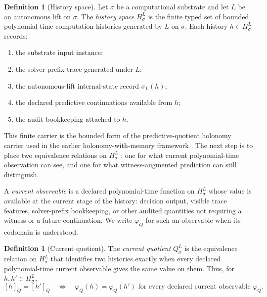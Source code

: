 \documentclass[11pt]{article}
\newcommand{\Substrate}{\sigma}             \newcommand{\Lift}{L}                       \newcommand{\LiftState}{\sigma_{L}}         \newcommand{\HistorySpace}{H_{\Substrate}^{\Lift}}
\newcommand{\Qquotient}{Q_{\Substrate}^{\Lift}}
\newcommand{\Qclass}[1]{[#1]_{Q}}
\newcommand{\CurrentObservable}{\varphi_{Q}}    \newcommand{\Exposure}{\operatorname{Exposure}}
\theoremstyle{definition}
\newtheorem{definition}[theorem]{Definition}
\begin{document}
\begin{definition}[History space]
\label{def:history-space}
Let \(\Substrate\) be a computational substrate and let \(\Lift\) be
an autonomous lift on \(\Substrate\).  The \emph{history space}
\(\HistorySpace\) is the finite typed set of bounded polynomial-time
computation histories generated by \(\Lift\) on \(\Substrate\).  Each
history \(h\in\HistorySpace\) records:
\begin{enumerate}
  \item the substrate input instance;
  \item the solver-prefix trace generated under \(\Lift\);
  \item the autonomous-lift internal-state record \(\LiftState(h)\);
  \item the declared predictive continuations available from \(h\);
  \item the audit bookkeeping attached to \(h\).
\end{enumerate}
\end{definition}

This finite carrier is the bounded form of the predictive-quotient
holonomy carrier used in the earlier holonomy-with-memory framework
\citep{TsiokosHolonomyMemory2026}.  The next step is to place two
equivalence relations on \(\HistorySpace\)
\citep{Halmos1960NaiveSetTheory}: one for what current polynomial-time
observation can see, and one for what witness-augmented prediction can
still distinguish.

A \emph{current observable} is a declared polynomial-time function on
\(\HistorySpace\) whose value is available at the current stage of the
history: decision output, visible trace features, solver-prefix
bookkeeping, or other audited quantities not requiring a witness or a
future continuation.  We write \(\CurrentObservable\) for such an
observable when its codomain is understood.

\begin{definition}[Current quotient]
\label{def:current-quotient}
The \emph{current quotient} \(\Qquotient\) is the equivalence relation
on \(\HistorySpace\) that identifies two histories exactly when every
declared polynomial-time current observable gives the same value on
them.  Thus, for \(h,h'\in\HistorySpace\),
\[
  \Qclass{h}=\Qclass{h'}
  \quad\Longleftrightarrow\quad
  \CurrentObservable(h)=\CurrentObservable(h')
  \text{ for every declared current observable }\CurrentObservable .
\]
\end{definition}
\end{document}
